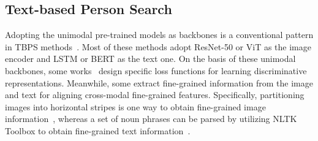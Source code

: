 \documentclass[letterpaper]{article} %
\begin{document}
\subsection{Text-based Person Search}

Adopting the unimodal pre-trained models as backbones is a conventional pattern in TBPS methods~\cite{wang2020vitaa, wu2021lapscore, li2017identity,li2022learning}. Most of these methods adopt ResNet-50 or ViT as the image encoder and LSTM or BERT as the text one. On the basis of these unimodal backbones, some works~\cite{zhang2018deep, sarafianos2019adversarial, li2017identity,li2022learning} design specific loss functions for learning discriminative representations.
Meanwhile, some extract fine-grained information from the image and text for aligning cross-modal fine-grained features. Specifically, partitioning images into horizontal stripes is one way to obtain fine-grained image information~\cite{chen2022tipcb, zheng2020dual, ding2021semantically}, whereas a set of noun phrases can be parsed by utilizing NLTK Toolbox to obtain fine-grained text information~\cite{wang2020vitaa}.

\end{document}
